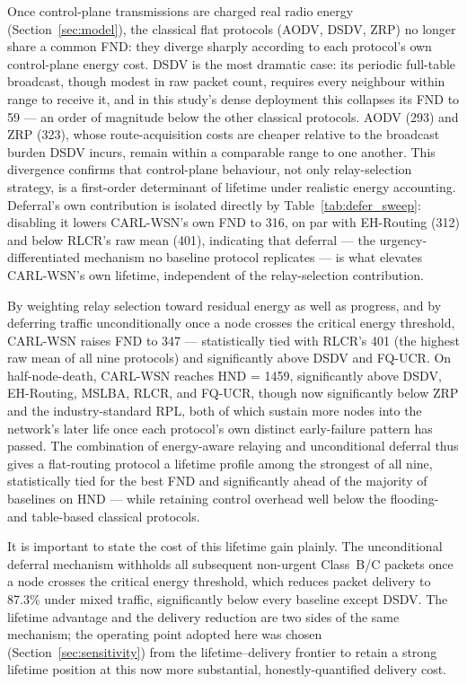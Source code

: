 \documentclass[12pt]{article}
\begin{document}
Once control-plane transmissions are charged real radio energy
(Section~\ref{sec:model}), the classical flat protocols (AODV, DSDV,
ZRP) no longer share a common FND: they diverge sharply according to
each protocol's own control-plane energy cost. DSDV is the most
dramatic case: its periodic full-table broadcast, though modest in
raw packet count, requires every neighbour within range to receive
it, and in this study's dense deployment this collapses its FND to
59 --- an order of magnitude below the other classical protocols.
AODV (293) and ZRP (323), whose route-acquisition costs are cheaper
relative to the broadcast burden DSDV incurs, remain within a
comparable range to one another. This divergence confirms that
control-plane behaviour, not only relay-selection strategy, is a
first-order determinant of lifetime under realistic energy
accounting. Deferral's own contribution is isolated directly by Table~\ref{tab:defer_sweep}:
disabling it lowers CARL-WSN's own FND to 316, on par with EH-Routing
(312) and below RLCR's raw mean (401), indicating that deferral
--- the urgency-differentiated mechanism no baseline protocol
replicates --- is what elevates CARL-WSN's own lifetime, independent
of the relay-selection contribution.

By weighting relay selection toward residual energy as well as
progress, and by deferring traffic unconditionally once a node
crosses the critical energy threshold, CARL-WSN raises FND to 347 ---
statistically tied with RLCR's 401 (the highest raw mean of all nine
protocols) and significantly above DSDV and FQ-UCR. On half-node-death,
CARL-WSN reaches HND = 1459, significantly above DSDV, EH-Routing,
MSLBA, RLCR, and FQ-UCR, though now significantly below ZRP and the
industry-standard RPL, both of which sustain more nodes into the
network's later life once each protocol's own distinct early-failure
pattern has passed. The combination of energy-aware relaying and
unconditional deferral thus gives a flat-routing protocol a lifetime
profile among the strongest of all nine, statistically tied for the
best FND and significantly ahead of the majority of baselines on
HND --- while retaining control overhead well below the flooding-
and table-based classical protocols.

It is important to state the cost of this lifetime gain plainly. The
unconditional deferral mechanism withholds all subsequent non-urgent
Class~B/C packets once a node crosses the critical energy threshold,
which reduces packet delivery to 87.3\% under mixed traffic,
significantly below every baseline except DSDV. The lifetime
advantage and the delivery reduction are two sides of the same
mechanism; the operating point adopted here was chosen
(Section~\ref{sec:sensitivity}) from the lifetime--delivery frontier
to retain a strong lifetime position at this now more substantial,
honestly-quantified delivery cost.
\end{document}
